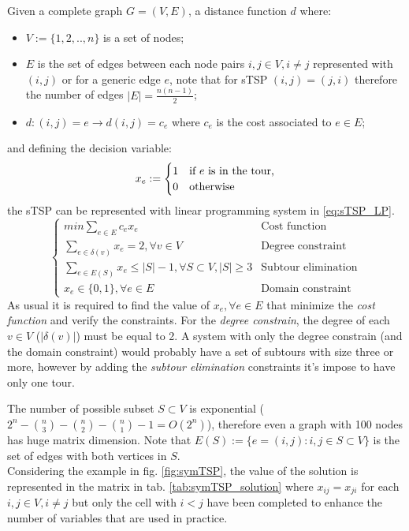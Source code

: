 Given a complete graph $ G = (V, E) $, a distance function $ d $ where:
\begin{itemize}
	\item $ V := \{1, 2, .., n\}$ is a set of nodes;
	\item $ E $ is the set of edges between each node pairs $ i,j \in V, i \ne j $ represented with $ (i,j) $ or for a generic edge $ e $, note that for sTSP $ (i,j) = (j,i) $ therefore the number of edges $ |E| = \frac{n(n-1)}{2} $;
	\item $ d: (i,j) = e \to d(i,j) = c_e $ where $ c_e $ is the cost associated to $ e \in E $;
\end{itemize}
and defining the decision variable:
\[
x_e := \begin{cases}
	1 & \text{if $ e $ is in the tour,} \\
	0 & \text{otherwise}
\end{cases}
\] 
the sTSP can be represented with linear programming system in \ref{eq:sTSP_LP}. 
\begin{equation}
\begin{cases}
		min \sum_{ e\in E } c_ex_e & \text{Cost function} \\
		\sum_{e\in \delta (v) } x_e = 2, \forall v \in V  & \text{Degree constraint} \\
		\sum_{e\in E(S) } x_e \le |S|-1, \forall S \subset V, |S| \ge 3  & \text{Subtour elimination} \\
		x_e \in \{0,1\}, \forall e \in E & \text{Domain constraint}
\end{cases}
\label{eq:sTSP_LP}
\end{equation} 
As usual it is required to find the value of $ x_e, \forall e \in E $ that minimize the \textit{cost function} and verify the constraints.
For the \textit{degree constrain}, the degree of each $ v \in V $ ($ |\delta(v)| $) must be equal to 2. A system with only the degree constrain (and the domain constraint) would probably have a set of subtours with size three or more, however by adding the \textit{subtour elimination} constraints  it's impose to have only one tour.

The number of possible subset $ S \subset V $ is exponential ($ 2^{n} - \binom{n}{3} -\binom{n}{2} -\binom{n}{1} - 1 = O(2^n)$), therefore even a graph with 100 nodes has huge matrix dimension. Note that $ E(S) := \{ e = (i,j): i,j \in S \subset V \}$ is the set of edges with both vertices in $ S $.\\
Considering the example in fig. \ref{fig:symTSP}, the value of the solution is represented in the matrix in tab. \ref{tab:symTSP_solution} where $ x_{ij} = x_{ji} $ for each $ i,j \in V, i \ne j $ but only the cell with $ i < j $ have been completed to enhance the number of variables that are used in practice.

